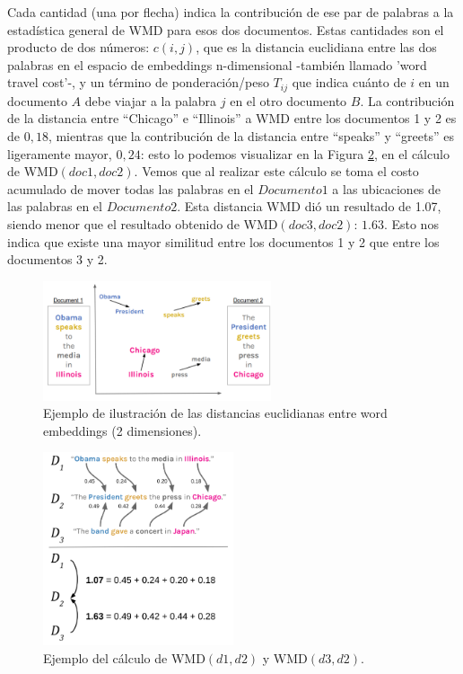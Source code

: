 \documentclass[12pt,a4paper]{article}
\begin{document}
\begin{sloppypar}
Cada cantidad (una por flecha) indica la contribución de ese par de palabras a la estadística general de WMD para esos dos documentos. Estas cantidades son el producto de dos números: $c(i,j)$, que es la distancia euclidiana entre las dos palabras en el espacio de embeddings n-dimensional -también llamado 'word travel cost'-, y un término de ponderación/peso $T_{ij}$ que indica cuánto de $i$ en un documento $A$ debe viajar a la palabra $j$ en el otro documento $B$. La contribución de la distancia entre “Chicago” e “Illinois” a WMD entre los documentos 1 y 2 es de $0,18$, mientras que la contribución de la distancia entre “speaks” y “greets” es ligeramente mayor, $0,24$: esto lo podemos visualizar en la Figura \ref{fig:Imagen_NLP_37}, en el cálculo de WMD$(doc1, doc2)$. Vemos que al realizar este cálculo se toma el costo acumulado de mover todas las palabras en el $Documento 1$ a las ubicaciones de las palabras en el $Documento 2$. Esta distancia WMD dió un resultado de 1.07, siendo menor que el resultado obtenido de WMD$(doc3, doc2)$: $1.63$. Esto nos indica que existe una mayor similitud entre los documentos 1 y 2 que entre los documentos 3 y 2. 

\begin{figure}[H]    
 \centering
 \includegraphics[width=0.6\textwidth]{images/NLP/36.png}
 \captionsetup{justification=centering,margin=2cm}
 \caption{Ejemplo de ilustración de las distancias euclidianas entre word embeddings (2 dimensiones)\cite{NLP_21}.}
 \label{fig:Imagen_NLP_36}
\end{figure}

\begin{figure}[H]    
 \centering
 \includegraphics[width=0.5\textwidth]{images/NLP/37.png}
 \captionsetup{justification=centering,margin=2cm}
 \caption{Ejemplo del cálculo de WMD$(d1,d2)$ y WMD$(d3,d2)$\cite{NLP_21}.}
 \label{fig:Imagen_NLP_37}
\end{figure}


\end{sloppypar}
\end{document}
